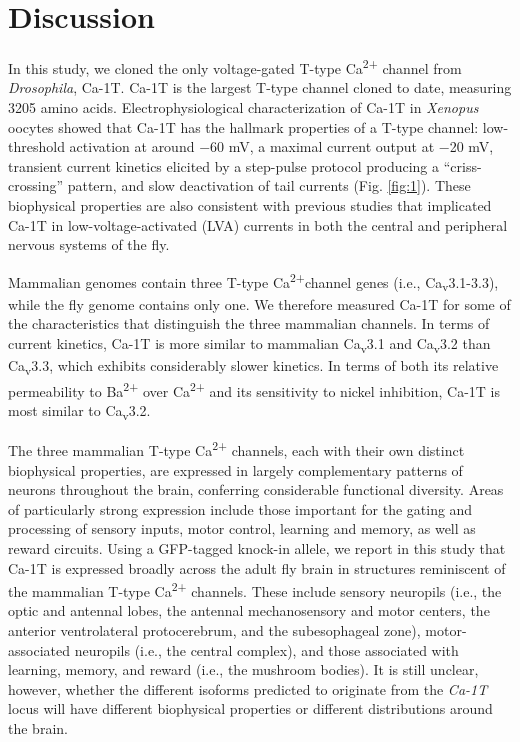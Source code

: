 \section*{Discussion}

In this study, we cloned the only voltage-gated T-type Ca\textsuperscript{2+} channel from \emph{Drosophila}, Ca-\alpha1T.
Ca-\alpha1T is the largest T-type channel cloned to date, measuring 3205 amino acids\cite{senatore:2010aa}.
Electrophysiological characterization of Ca-\alpha1T in \emph{Xenopus} oocytes showed that Ca-\alpha1T has the hallmark properties of a T-type channel: low-threshold activation at around $-$60 mV, a maximal current output at $-$20 mV, transient current kinetics elicited by a step-pulse protocol producing a ``criss-crossing'' pattern, and slow deactivation of tail currents (Fig. \ref{fig:1}).
These biophysical properties are also consistent with previous studies that implicated Ca-\alpha1T in low-voltage-activated (LVA) currents in both the central and peripheral nervous systems of the fly\cite{Ryglewski:2012jk, Iniguez:2013ib}.

Mammalian genomes contain three T-type Ca\textsuperscript{2+}channel genes (i.e., Ca\textsubscript{v}3.1-3.3), while the fly genome contains only one.
We therefore measured Ca-\alpha1T for some of the characteristics that distinguish the three mammalian channels.
In terms of current kinetics, Ca-\alpha1T is more similar to mammalian Ca\textsubscript{v}3.1 and Ca\textsubscript{v}3.2 than Ca\textsubscript{v}3.3, which exhibits considerably  slower kinetics.
In terms of both its relative permeability to Ba\textsuperscript{2+} over Ca\textsuperscript{2+} and its sensitivity to nickel inhibition, Ca-\alpha1T is most similar to Ca\textsubscript{v}3.2\cite{kang:2006aa, park:2013aa}.

The three mammalian T-type Ca\textsuperscript{2+} channels,  each with their own distinct biophysical properties, are expressed in largely complementary patterns of neurons throughout the brain, conferring considerable functional diversity. Areas of particularly strong expression include those important for the gating and processing of sensory inputs, motor control, learning and memory, as well as reward circuits\cite{talley:1999aa}. 
Using a GFP-tagged knock-in allele, we report in this study that Ca-\alpha1T is expressed broadly across the adult fly brain in structures reminiscent of the mammalian T-type Ca\textsuperscript{2+} channels.
These include sensory neuropils (i.e., the optic and antennal lobes, the antennal mechanosensory and motor centers, the anterior ventrolateral protocerebrum, and the subesophageal zone), motor-associated neuropils (i.e., the central complex), and those associated with learning, memory, and reward (i.e., the mushroom bodies).
It is still unclear, however, whether the different isoforms predicted to originate from the \emph{Ca-\alpha1T} locus will have different biophysical properties or different distributions around the brain. 

